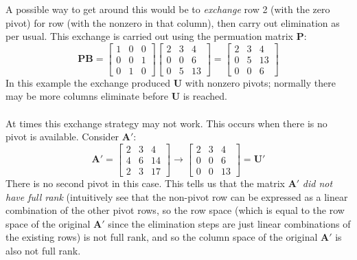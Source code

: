 \documentclass{report}
\begin{document}
A possible way to get around this would be to \textit{exchange} row 2 (with the zero pivot) for row (with the nonzero in that column), then carry out elimination
as per usual. This exchange is carried out using the permuation matrix $\bm P$:
\begin{equation*}
\bm{PB}=
\left[\begin{array}{ccc}
1&0&0\\
0&0&1\\
0&1&0
\end{array}\right]
\left[\begin{array}{ccc}
2&3&4\\
0&0&6\\
0&5&13
\end{array}\right]=
\left[\begin{array}{ccc}
2&3&4\\
0&5&13\\
0&0&6
\end{array}\right]
\end{equation*}
In this example the exchange produced $\bm U$ with nonzero pivots; normally there may be more columns eliminate before $\bm U$ is reached.\\
\vspace{1mm}\\
At times this exchange strategy may not work. This occurs when there is no pivot is available. Consider $\bm A'$:
\begin{equation*}
\bm A'=\left[\begin{array}{ccc}
2&3&4\\
4&6&14\\
2&3&17
\end{array}\right]\to
\left[\begin{array}{ccc}
2&3&4\\
0&0&6\\
0&0&13
\end{array}\right]=\bm U'
\end{equation*}
There is no second pivot in this case. This tells us that the matrix $\bm A'$ \textit{did not have full rank} (intuitively see that the non-pivot row can be expressed
as a linear combination of the other pivot rows, so the row space 
(which is equal to the row space of the original $\bm A'$ since the elimination steps are just linear combinations of the existing rows) 
is not full rank, and so the column space of the 
original $\bm A'$ is also not full rank.\\
\vspace{1mm}\\
\end{document}
